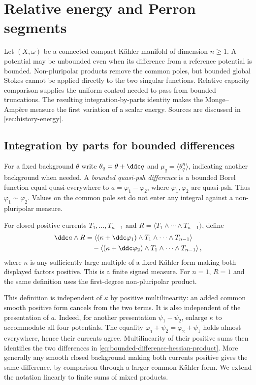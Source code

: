 \chapter{Relative energy and Perron segments}
\label{chap:q11}
Let $(X,\omega)$ be a connected compact K\"ahler manifold of dimension $n\geq1$. A potential may be unbounded even when its difference from a reference potential is bounded. Non-pluripolar products remove the common poles, but bounded global Stokes cannot be applied directly to the two singular functions. Relative capacity comparison supplies the uniform control needed to pass from bounded truncations. The resulting integration-by-parts identity makes the Monge--Amp\`ere measure the first variation of a scalar energy. Sources are discussed in \cref{sec:history-energy}.

\section{Integration by parts for bounded differences}
\label{sec:singular-bounded-difference-integration}
For a fixed background $\theta$ write $\theta_q=\theta+\ddc q$ and $\mu_q=\langle\theta_q^n\rangle$, indicating another background when needed. A \emph{bounded quasi-psh difference} is a bounded Borel function equal quasi-everywhere to $a=\varphi_1-\varphi_2$, where $\varphi_1,\varphi_2$ are quasi-psh. Thus $\varphi_1\sim\varphi_2$. Values on the common pole set do not enter any integral against a non-pluripolar measure.

For closed positive currents $T_1,\ldots,T_{n-1}$ and $R=\langle T_1\wedge\cdots\wedge T_{n-1}\rangle$, define
\begin{equation}\label{eq:bounded-difference-hessian-product}
 \begin{aligned}
 \ddc a\wedge R
   &=\left\langle(\kappa+\ddc\varphi_1)\wedge T_1\wedge\cdots\wedge T_{n-1}\right\rangle\\
    &\quad-\left\langle(\kappa+\ddc\varphi_2)\wedge T_1\wedge\cdots\wedge T_{n-1}\right\rangle,
 \end{aligned}
\end{equation}
where $\kappa$ is any sufficiently large multiple of a fixed K\"ahler form making both displayed factors positive. This is a finite signed measure. For $n=1$, $R=1$ and the same definition uses the first-degree non-pluripolar product.

This definition is independent of $\kappa$ by positive multilinearity: an added common smooth positive form cancels from the two terms. It is also independent of the presentation of $a$. Indeed, for another presentation $\psi_1-\psi_2$, enlarge $\kappa$ to accommodate all four potentials. The equality
$\varphi_1+\psi_2=\varphi_2+\psi_1$ holds almost everywhere, hence their currents agree. Multilinearity of their positive sums then identifies the two differences in \eqref{eq:bounded-difference-hessian-product}. More generally any smooth closed background making both currents positive gives the same difference, by comparison through a larger common K\"ahler form. We extend the notation linearly to finite sums of mixed products.

